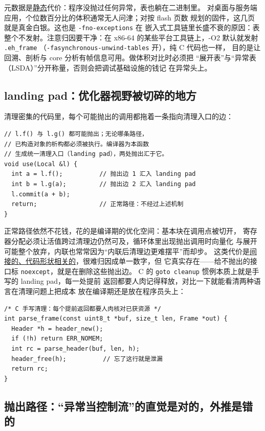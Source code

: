 \documentclass[12pt,a4paper,fontset=fandol]{ctexbook}
\newcommand{\Tp}[1]{\texttt{#1}}
\newcommand{\Bk}{\discretionary{}{}{}}
\begin{document}
元数据是\underline{静态}代价：程序没抛过任何异常，表也躺在二进制里。
对桌面与服务端应用，个位数百分比的体积通常无人问津；对按 flash 页数
规划的固件，这几页就是真金白银。这也是 \Tp{-fno-{\Bk}exceptions} 在
嵌入式工具链里长盛不衰的原因：表整个不发射。注意归因要干净：在
x86-64 的某些平台工具链上，-O2 默认就发射 \Tp{.eh\_frame}
（\Tp{-fasynchronous-{\Bk}unwind{\Bk}-tables} 开），纯 C 代码也一样，
目的是让回溯、剖析与 core 分析有帧信息可用。做体积对比时必须把
``展开表''与``异常表（LSDA）''分开称量，否则会把调试基础设施的钱记
在异常头上。

\subsection*{landing pad：优化器视野被切碎的地方}

清理密集的代码里，每个可能抛出的调用都拖着一条指向清理入口的边：

\begin{lstlisting}[style=cppstyle]
// l.f() 与 l.g() 都可能抛出；无论哪条路径，
// 已构造对象的析构都必须被执行。编译器为本函数
// 生成统一清理入口（landing pad），两处抛出汇于它。
void use(Local &l) {
  int a = l.f();          // 抛出边 1 汇入 landing pad
  int b = l.g(a);         // 抛出边 2 汇入 landing pad
  l.commit(a + b);
  return;                 // 正常路径：不经过上述机制
}
\end{lstlisting}

正常路径依然不花钱，花的是编译期的优化空间：基本块在调用点被切开，
寄存器分配必须让活值跨过清理边仍然可及，循环体里出现抛出调用时向量化
与展开可能整个放弃，内联也常常因为``内联后清理边更难摆平''而却步。
这类代价是\underline{间接的、代码形状相关的}，很难归因成单一数字，但
它真实存在——给不抛出的接口标 \Tp{noexcept}，就是在删除这些抛出边。
C 的 \Tp{goto cleanup} 惯例本质上就是手写的 landing pad，每一处提前
返回都要人肉记得释放，对比一下就能看清两种语言在清理问题上把成本
放在编译期还是放在程序员头上：

\begin{lstlisting}[style=cstyle]
/* C 手写清理：每个提前返回都要人肉核对已获资源 */
int parse_frame(const uint8_t *buf, size_t len, Frame *out) {
  Header *h = header_new();
  if (!h) return ERR_NOMEM;
  int rc = parse_header(buf, len, h);
  header_free(h);          // 忘了这行就是泄漏
  return rc;
}
\end{lstlisting}

\subsection*{抛出路径：``异常当控制流''的直觉是对的，外推是错的}
\end{document}
